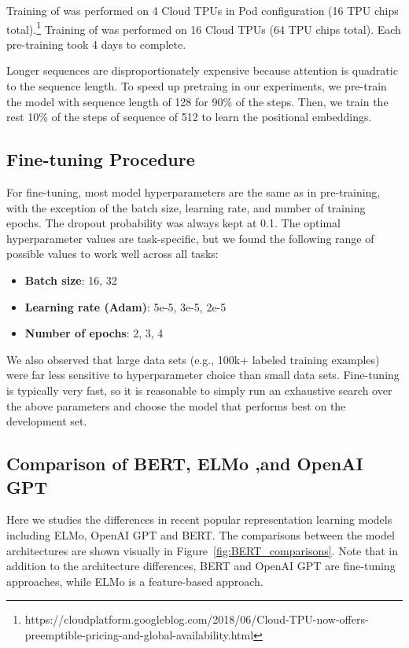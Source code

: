 Training of \bertbase was performed on 4 Cloud TPUs in Pod configuration (16 TPU chips total).\footnote{https://cloudplatform.googleblog.com/2018/06/Cloud-TPU-now-offers-preemptible-pricing-and-global-availability.html} Training of \bertlarge was performed on 16 Cloud TPUs (64 TPU chips total). Each pre-training took 4 days to complete.

Longer sequences are disproportionately expensive because attention is quadratic to the sequence length. To speed up pretraing in our experiments, we pre-train the model with sequence length of 128 for 90\% of the steps. Then, we train
the rest 10\% of the steps of sequence of 512 to learn the positional embeddings.

\subsection{Fine-tuning Procedure}
For fine-tuning, most model hyperparameters are the same as in pre-training, with the exception of the batch size, learning rate, and number of training epochs. The dropout probability was always kept at 0.1. The optimal hyperparameter values are task-specific, but we found the following range of possible values to work well across all tasks:

\begin{itemize}[noitemsep]
\item {\bf Batch size}: 16, 32
\item {\bf Learning rate (Adam)}: 5e-5, 3e-5, 2e-5
\item {\bf Number of epochs}: 2, 3, 4
\end{itemize}

We also observed that large data sets (e.g., 100k+ labeled training examples) were far less sensitive to hyperparameter choice than small data sets. Fine-tuning is typically very fast, so it is reasonable to simply run an exhaustive search over the above parameters and choose the model that performs best on the development set.

\subsection{Comparison of BERT, ELMo ,and OpenAI GPT}
\label{appendix:sec:comparing_bert_and_openai}

Here we studies the differences in recent popular representation learning
models including ELMo, OpenAI GPT and BERT.
The comparisons between the model
architectures are shown visually in Figure~\ref{fig:BERT_comparisons}. Note that
in addition to the architecture differences, BERT and OpenAI GPT are fine-tuning approaches, while ELMo is a feature-based approach.

